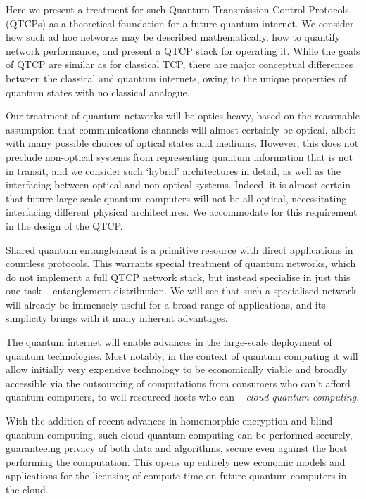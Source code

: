 \documentclass[aps,rmp,twocolumn,amsmath,amssymb,nofootinbib,superscriptaddress,longbibliography,floatfix,table-of-contents,eqsecnum]{revtex4-1}
\begin{document}
Here we present a treatment for such Quantum Transmission Control Protocols (QTCPs) as a theoretical foundation for a future quantum internet. We consider how such ad hoc networks may be described mathematically, how to quantify network performance, and present a QTCP stack for operating it. While the goals of QTCP are similar as for classical TCP, there are major conceptual differences between the classical and quantum internets, owing to the unique properties of quantum states with no classical analogue.

Our treatment of quantum networks will be optics-heavy, based on the reasonable assumption that communications channels will almost certainly be optical, albeit with many possible choices of optical states and mediums. However, this does not preclude non-optical systems from representing quantum information that is not in transit, and we consider such `hybrid' architectures in detail, as well as the interfacing between optical and non-optical systems. Indeed, it is almost certain that future large-scale quantum computers will not be all-optical, necessitating interfacing different physical architectures. We accommodate for this requirement in the design of the QTCP.

Shared quantum entanglement is a primitive resource with direct applications in countless protocols. This warrants special treatment of quantum networks, which do not implement a full QTCP network stack, but instead specialise in just this one task -- entanglement distribution. We will see that such a specialised network will already be immensely useful for a broad range of applications, and its simplicity brings with it many inherent advantages.

The quantum internet will enable advances in the large-scale deployment of quantum technologies. Most notably, in the context of quantum computing it will allow initially very expensive technology to be economically viable and broadly accessible via the outsourcing of computations from consumers who can't afford quantum computers, to well-resourced hosts who can -- \textit{cloud quantum computing}.

With the addition of recent advances in homomorphic encryption and blind quantum computing, such cloud quantum computing can be performed securely, guaranteeing privacy of both data and algorithms, secure even against the host performing the computation. This opens up entirely new economic models and applications for the licensing of compute time on future quantum computers in the cloud.
\end{document}
